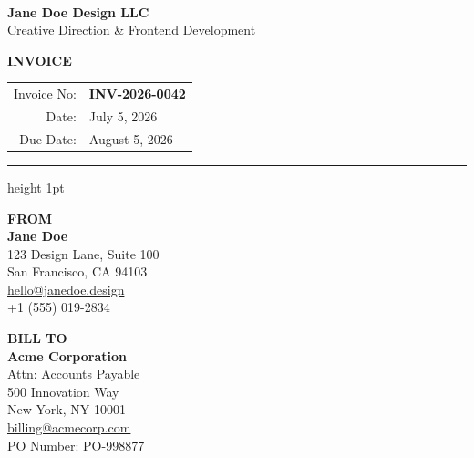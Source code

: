 \documentclass[10pt,letterpaper]{article}
\renewcommand{\arraystretch}{1.3} %
\begin{document}
\begin{minipage}[t]{0.5\textwidth}
    \vspace{0pt} %
     \\[3mm]
    {\sffamily\bfseries\large Jane Doe Design LLC} \\
    {\color{mutedneutral}\small Creative Direction \& Frontend Development}
\end{minipage}%
\begin{minipage}[t]{0.5\textwidth}
    \vspace{0pt} %
    \raggedleft
    {\color{accent}\Huge\bfseries INVOICE} \\[3mm]
    \renewcommand{\arraystretch}{1.1}
    \begin{tabular}{@{}r l@{}}
        {\color{mutedneutral}\small Invoice No:} & \textbf{\color{darkneutral}\small INV-2026-0042} \\
        {\color{mutedneutral}\small Date:}       & {\color{darkneutral}\small July 5, 2026} \\
        {\color{mutedneutral}\small Due Date:}   & {\color{darkneutral}\small August 5, 2026}
    \end{tabular}
\end{minipage}

\vspace{6mm}
{\color{lightneutral}\hrule height 1pt}
\vspace{6mm}

\begin{minipage}[t]{0.5\textwidth}
    \vspace{0pt}
    {\color{accent}\bfseries\small FROM} \\[2mm]
    {\bfseries\color{darkneutral} Jane Doe} \\
    {\color{mutedneutral}\small
    123 Design Lane, Suite 100 \\
    San Francisco, CA 94103 \\
    \href{mailto:hello@janedoe.design}{hello@janedoe.design} \\
    +1 (555) 019-2834
    }
\end{minipage}%
\begin{minipage}[t]{0.5\textwidth}
    \vspace{0pt}
    {\color{accent}\bfseries\small BILL TO} \\[2mm]
    {\bfseries\color{darkneutral} Acme Corporation} \\
    {\color{mutedneutral}\small
    Attn: Accounts Payable \\
    500 Innovation Way \\
    New York, NY 10001 \\
    \href{mailto:billing@acmecorp.com}{billing@acmecorp.com} \\
    PO Number: PO-998877
    }
\end{minipage}
\end{document}
